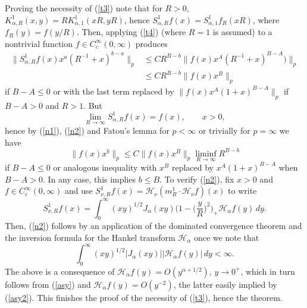 \documentclass[leqno,a4paper]{amsart}
\begin{document}
Proving the necessity of (\ref{t3}) note that for $R>0$,
$K_{\alpha,R}^1(x,y)=R K_{\alpha,1}^1(xR,yR)$, hence
$S_{\alpha,R}^1f(x)= S_{\alpha,1}^1f_R(xR)$,
where $f_R(y)=f(y/R)$. Then, applying (\ref{t4}) (where $R=1$ is assumed)
to a nontrivial function $f\in C^\infty_c(0,\infty)$ produces
\begin{align}
\|S_{\alpha,R}^1 f(x)x^a(R^{-1}+x)^{b-a}\|_p
&\le C R^{B-b}\|f(x)x^A(R^{-1}+x)^{B-A})\|_p \nonumber\\
&\le C R^{B-b}\|f(x)x^B\|_p
\label{n1}
\end{align}
if $B-A\le0$ or with the last term replaced by $\|f(x)x^A(1+x)^{B-A}\|_p$ if
$B-A>0$ and $R>1$. But
\begin{equation}
\lim_{R\to\infty}S_{\alpha,R}^1 f(x)=f(x), \qquad x>0,
\label{n2}
\end{equation}
hence by (\ref{n1}), (\ref{n2}) and Fatou's lemma for $p<\infty$ or trivially for
$p=\infty$ we have
\begin{equation}
\|f(x)x^b\|_p\le C \|f(x)x^B\|_p\liminf_{R\to\infty}R^{B-b}
\end{equation}
if $B-A\le0$ or analogous inequality with $x^B$ replaced by $x^A(1+x)^{B-A}$
when $B-A>0$. In any case, this implies $b\le B$. To verify (\ref{n2}),
fix $x>0$ and $f\in C^\infty_c(0,\infty)$ and use $S_{\nu,R}^1f(x)
= {\mathcal H}_\nu(m_R^1\cdot{\mathcal H}_\nu f)(x)$ to write
\begin{equation*}
S_{\nu,R}^1 f(x) = \int_0^\infty (xy)^{1/2}J_\alpha(xy)\Big(1-\Big(
\frac yR\Big)^2\Big)_+{\mathcal H}_\alpha f(y)\,dy.
\end{equation*}
Then, (\ref{n2}) follows by an application of the dominated
convergence theorem and the inversion formula for the Hankel
transform ${\mathcal H}_\alpha$ once we note that
$$
\int_0^\infty (xy)^{1/2}|J_\alpha(xy)||{\mathcal H}_\alpha f(y)|\,dy
< \infty.
$$
The above is a consequence of ${\mathcal H}_\alpha
f(y)=O(y^{\alpha+1/2})$, $y\to0^+$, which in turn follows from
(\ref{asy}) and ${\mathcal H}_\alpha f(y) = O(y^{-2})$, the latter
easily implied by (\ref{asy2}). This finishes the proof of the
necessity of (\ref{t3}), hence the theorem.
\end{document}
